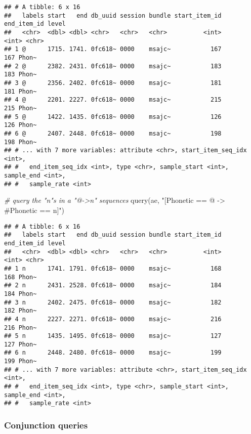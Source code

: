 \documentclass[
]{book}
\newenvironment{Shaded}{\begin{snugshade}}{\end{snugshade}}
\newcommand{\CommentTok}[1]{\textcolor[rgb]{0.56,0.35,0.01}{\textit{#1}}}
\newcommand{\FunctionTok}[1]{\textcolor[rgb]{0.00,0.00,0.00}{#1}}
\newcommand{\NormalTok}[1]{#1}
\newcommand{\StringTok}[1]{\textcolor[rgb]{0.31,0.60,0.02}{#1}}
\begin{document}
\begin{verbatim}
## # A tibble: 6 x 16
##   labels start   end db_uuid session bundle start_item_id end_item_id level
##   <chr>  <dbl> <dbl> <chr>   <chr>   <chr>          <int>       <int> <chr>
## 1 @      1715. 1741. 0fc618~ 0000    msajc~           167         167 Phon~
## 2 @      2382. 2431. 0fc618~ 0000    msajc~           183         183 Phon~
## 3 @      2356. 2402. 0fc618~ 0000    msajc~           181         181 Phon~
## 4 @      2201. 2227. 0fc618~ 0000    msajc~           215         215 Phon~
## 5 @      1422. 1435. 0fc618~ 0000    msajc~           126         126 Phon~
## 6 @      2407. 2448. 0fc618~ 0000    msajc~           198         198 Phon~
## # ... with 7 more variables: attribute <chr>, start_item_seq_idx <int>,
## #   end_item_seq_idx <int>, type <chr>, sample_start <int>, sample_end <int>,
## #   sample_rate <int>
\end{verbatim}

\begin{Shaded}
\begin{Highlighting}[]
\CommentTok{\# query the "n"s in a "@{-}\textgreater{}n" sequences}
\FunctionTok{query}\NormalTok{(ae, }\StringTok{"[Phonetic == @ {-}\textgreater{} \#Phonetic == n]"}\NormalTok{)}
\end{Highlighting}
\end{Shaded}

\begin{verbatim}
## # A tibble: 6 x 16
##   labels start   end db_uuid session bundle start_item_id end_item_id level
##   <chr>  <dbl> <dbl> <chr>   <chr>   <chr>          <int>       <int> <chr>
## 1 n      1741. 1791. 0fc618~ 0000    msajc~           168         168 Phon~
## 2 n      2431. 2528. 0fc618~ 0000    msajc~           184         184 Phon~
## 3 n      2402. 2475. 0fc618~ 0000    msajc~           182         182 Phon~
## 4 n      2227. 2271. 0fc618~ 0000    msajc~           216         216 Phon~
## 5 n      1435. 1495. 0fc618~ 0000    msajc~           127         127 Phon~
## 6 n      2448. 2480. 0fc618~ 0000    msajc~           199         199 Phon~
## # ... with 7 more variables: attribute <chr>, start_item_seq_idx <int>,
## #   end_item_seq_idx <int>, type <chr>, sample_start <int>, sample_end <int>,
## #   sample_rate <int>
\end{verbatim}

\hypertarget{conjunction-queries}{%
\subsubsection{Conjunction queries}\label{conjunction-queries}}
\end{document}

